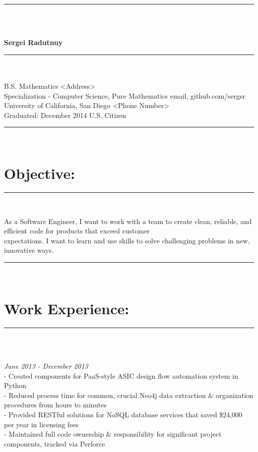 \documentclass{article}
\newcommand{\sline}{\noindent\rule{575pt}{0.5pt}}
\begin{document}
\sline \\\\
\centerline{\textbf{{\Large Sergei Radutnuy}}}
\sline \\\\
	\indent B.S. Mathematics
  \hfill <Address>\\
	\indent Specialization - Computer Science, Pure Mathematics
  \hspace{139pt} email, github.com/sergsr \\
	\indent University of California, San Diego
  \hspace{220pt} <Phone Number>\\
	\indent Graduated: December 2014
  \hspace{205.5pt} U.S. Citizen   \\

\sline \\
\section*{Objective:}
\sline \\
\begin{spacing}{1.0}
  \indent As a Software Engineer, I want to work with a team to create clean,
          reliable, and efficient code for products that exceed customer \\
  \indent expectations. I want to learn and use skills to solve challenging
          problems in new, innovative ways.
\end{spacing}

\sline \\
\section*{Work Experience:}
\sline \\

\begin{spacing}{1.0}
    \\
  \hfill {\sl June 2013 - December 2013} \\
  \indent \indent - Created components for PaaS-style ASIC design flow
                    automation system in Python\\
  \indent \indent - Reduced process time for common, crucial Neo4j data
                    extraction \& organization procedures from hours to minutes
                    \\
  \indent \indent - Provided RESTful solutions for NoSQL database services that
                    saved \$24,000 per year in licensing fees \\
  \indent \indent - Maintained full code ownership \& responsibility for
                    significant project components, tracked via Perforce
\end{spacing}
\end{document}
